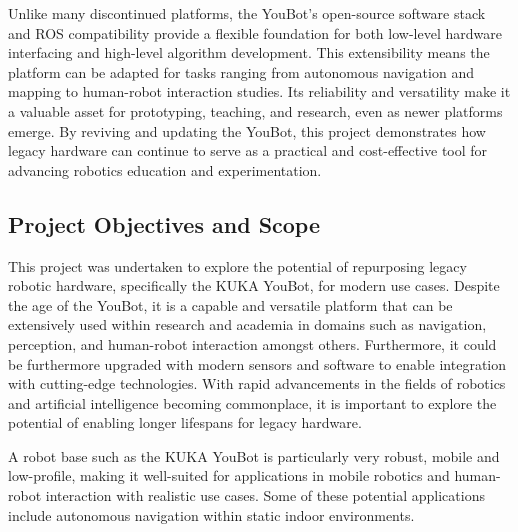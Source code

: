 \documentclass[a4paper, 12pt]{article}
\newif\ifshowadi
\newcommand{\adi}[1]{\ifshowadi\textcolor{red}{#1}\fi}
\newif\ifshownotes
\newcommand{\notes}[1]{\ifshownotes\textcolor{blue}{#1}\fi}
\begin{document}
    Unlike many discontinued platforms, the YouBot's open-source software stack and ROS compatibility provide a flexible foundation for both low-level hardware interfacing and high-level algorithm development. This extensibility means the platform can be adapted for tasks ranging from autonomous navigation and mapping to human-robot interaction studies. Its reliability and versatility make it a valuable asset for prototyping, teaching, and research, even as newer platforms emerge. By reviving and updating the YouBot, this project demonstrates how legacy hardware can continue to serve as a practical and cost-effective tool for advancing robotics education and experimentation.


    \subsection{Project Objectives and Scope}
    \adi{Project objectives: What are the goals of the project? What do I want to achieve? This is a high-level overview of the project and its roadmap.}
    \notes{1.4 Project Objectives and Scope: Initial objective: Full robot revival with autonomous navigation using a Kinect sensor. Revised direction: Due to constraints, focused on: Re-enabling hardware operation. Evaluating performance. Documenting the restoration process. What this document provides: Overview of the project flow. Assessment of hardware/software components. Challenges faced and how they were handled. Ideas for future directions.}

    This project was undertaken to explore the potential of repurposing legacy robotic hardware, specifically the KUKA YouBot, for modern use cases. Despite the age of the YouBot, it is a capable and versatile platform that can be extensively used within research and academia in domains such as navigation, perception, and human-robot interaction amongst others. Furthermore, it could be furthermore upgraded with modern sensors and software to enable integration with cutting-edge technologies. With rapid advancements in the fields of robotics and artificial intelligence becoming commonplace, it is important to explore the potential of enabling longer lifespans for legacy hardware.

    A robot base such as the KUKA YouBot is particularly very robust, mobile and low-profile, making it well-suited for applications in mobile robotics and human-robot interaction with realistic use cases. Some of these potential applications include autonomous navigation within static indoor environments. 
    
\end{document}
